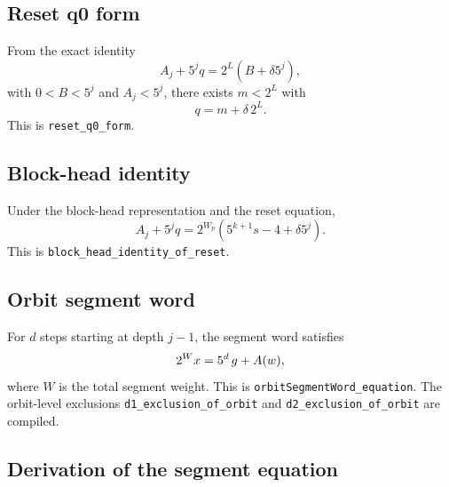 \subsection{Reset q0 form}

\begin{lemma}
From the exact identity
\begin{equation*}
  A_j+5^jq=2^L(B+\delta5^j),
\end{equation*}
with $0<B<5^j$ and $A_j<5^j$, there exists $m<2^L$ with
\begin{equation*}
  q=m+\delta\,2^L.
\end{equation*}
This is \texttt{reset\_q0\_form}.
\end{lemma}

\subsection{Block-head identity}

\begin{lemma}
Under the block-head representation and the reset equation,
\begin{equation*}
  A_j+5^jq
    =2^{W_p}\left(5^{k+1}s-4+\delta5^j\right).
\end{equation*}
This is \texttt{block\_head\_identity\_of\_reset}.
\end{lemma}

\subsection{Orbit segment word}

For $d$ steps starting at depth $j-1$, the segment word satisfies
\begin{equation*}
  2^{W}x=5^d\,g+A(w),
\end{equation*}
where $W$ is the total segment weight.  This is
\texttt{orbitSegmentWord\_equation}.  The orbit-level exclusions
\texttt{d1\_exclusion\_of\_orbit} and
\texttt{d2\_exclusion\_of\_orbit} are compiled.

\subsection{Derivation of the segment equation}

